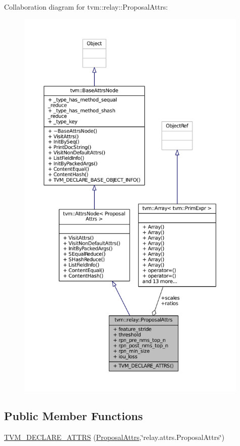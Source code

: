 Collaboration diagram for tvm\+:\+:relay\+:\+:Proposal\+Attrs\+:
\nopagebreak
\begin{figure}[H]
\begin{center}
\leavevmode
\includegraphics[height=550pt]{structtvm_1_1relay_1_1ProposalAttrs__coll__graph}
\end{center}
\end{figure}
\subsection*{Public Member Functions}
\begin{DoxyCompactItemize}
\item 
\hyperlink{structtvm_1_1relay_1_1ProposalAttrs_a28a8c0b09e033d6440d91081f251ffb2}{T\+V\+M\+\_\+\+D\+E\+C\+L\+A\+R\+E\+\_\+\+A\+T\+T\+RS} (\hyperlink{structtvm_1_1relay_1_1ProposalAttrs}{Proposal\+Attrs},\char`\"{}relay.\+attrs.\+Proposal\+Attrs\char`\"{})
\end{DoxyCompactItemize}
